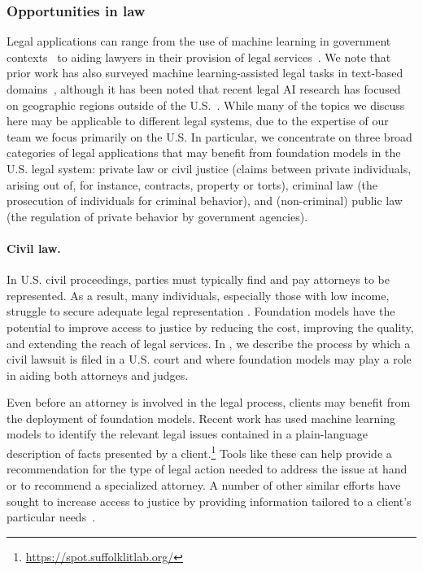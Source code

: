 \subsubsection{Opportunities in law}

Legal applications can range from the use of machine learning in government contexts~\citep{engstrom2020government,coglianese2020ai,re2019developing} to aiding lawyers in their provision of legal services~\citep{zheng2021does,huang2021context,ostendorff2021evaluating,vold2021using}. 
We note that prior work has also surveyed machine learning-assisted legal tasks in text-based domains~\citep{zhong2020does, chalkidis2020legal}, although it has been noted that recent legal AI research has focused on geographic regions outside of the U.S.~\citep{zheng2021does}. 
While many of the topics we discuss here may be applicable to different legal systems, due to the expertise of our team we focus primarily on the U.S. In particular, we concentrate on three broad categories of legal applications that may benefit from foundation models in the U.S. legal system: private law or civil justice (claims between private individuals, arising out of, for instance, contracts, property or torts), criminal law (\ie the prosecution of individuals for criminal behavior), and (non-criminal) public law (\eg the regulation of private behavior by government agencies).

\paragraph{Civil law.} In U.S. civil proceedings, parties must typically find and pay attorneys to be represented. As a result, many individuals, especially those with low income, struggle to secure adequate legal representation \citep{rhode2004access}. Foundation models have the potential to improve access to justice by reducing the cost, improving the quality, and extending the reach of legal services. In , we describe the process by which a civil lawsuit is filed in a U.S. court and where foundation models may play a role in aiding both attorneys and judges. 

Even before an attorney is involved in the legal process, clients may benefit from the deployment of foundation models. Recent work has used machine learning models to identify the relevant legal issues contained in a plain-language description of facts presented by a client.\footnote{\url{https://spot.suffolklitlab.org/}} Tools like these can help provide a recommendation for the type of legal action needed to address the issue at hand or to recommend a specialized attorney. A number of other similar efforts have sought to increase access to justice by providing information tailored to a client's particular needs~\citep{cabral2012using,brescia2014embracing,queudot2020improving,westermann2019using}.

